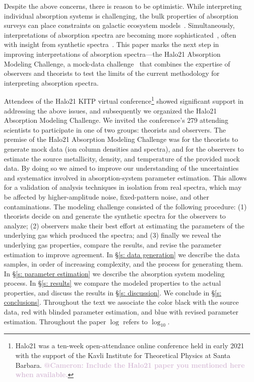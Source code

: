 \documentclass[fleqn,usenatbib]{mnras}
\makeatletter
\newcommand{\atcameron}[1]{\textcolor{Thistle}{\textbf{@Cameron: #1}}}
\makeatother
\begin{document}
Despite the above concerns, there is reason to be optimistic.
While interpreting individual absorption systems is challenging, the bulk properties of absorption surveys can place constraints on galactic ecosystem models~\citep[e.g.][]{sorini2018Fundamental, lan2018Circumgalactic}.
Simultaneously, interpretations of absorption spectra are becoming more sophisticated~\citep[e.g.][]{churchill2015Direct, sameer2021Cloudbycloud}, often with insight from synthetic spectra~\citep[e.g.][]{hummels2013Constraints, liang2018Observing}.
This paper marks the next step in improving interpretations of absorption spectra---the Halo21 Absorption Modeling Challenge, a mock-data challenge~\citep[e.g.][]{regimbau2012Mock, meacher2015Mock, hazboun2019Second} that combines the expertise of observers and theorists to test the limits of the current methodology for interpreting absorption spectra.

Attendees of the Halo21 KITP virtual conference\footnote{Halo21 was a ten-week open-attendance online conference held in early 2021 with the support of the Kavli Institute for Theoretical Physics at Santa Barbara. \atcameron{Include the Halo21 paper you mentioned here when available.}}
showed significant support in addressing the above issues, and subsequently we organized the Halo21 Absorption Modeling Challenge.
We invited the conference's 279 attending scientists to participate in one of two groups:
theorists and observers.
The premise of the Halo21 Absorption Modeling Challenge was for the theorists to generate mock data (ion column densities and spectra), and for the observers to estimate the source metallicity, density, and temperature of the provided mock data.
By doing so we aimed to improve our understanding of the uncertainties and systematics involved in absorption-system parameter estimation.
This allows for a validation of analysis techniques in isolation from real spectra,
which may be affected by higher-amplitude noise, fixed-pattern noise, and other contaminations.
The modeling challenge consisted of the following procedure:
(1) theorists decide on and generate the synthetic spectra for the observers to analyze; (2) observers make their best effort at estimating the parameters of the underlying gas which produced the spectra; and (3) finally we reveal the underlying gas properties, compare the results, and revise the parameter estimation to improve agreement.
In \S\ref{s: data generation} we describe the data samples, in order of increasing complexity, and the process for generating them.
In \S\ref{s:  parameter estimation} we describe the absorption system modeling process.
In \S\ref{s: results} we compare the modeled properties to the actual properties, and discuss the results in \S\ref{s: discussion}.
We conclude in \S\ref{s: conclusions}.
Throughout the text we associate the color black with the source data,
red with blinded parameter estimation,
and blue with revised parameter estimation.
Throughout the paper $\log$ refers to $\log_{10}$.
\end{document}
